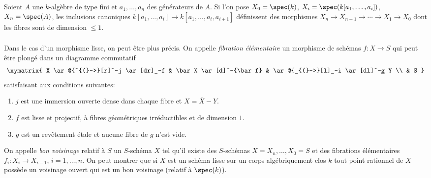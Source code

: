 \subsubsection{}\label{I:3-4-1}

Soient $A$ une $k$-algèbre de type fini et $a_1,\dotsc,a_n$ des générateurs de 
$A$. Si l'on pose $X_0=\spec(k)$, $X_i=\spec(k[a_1,\dotsc,a_i])$, 
$X_n=\spec(A)$, les inclusions canoniques 
$k[a_1,\dotsc,a_i]\to k[a_1,\dotsc,a_i,a_{i+1}]$ définissent des morphismes 
$X_n \to X_{n-1} \to \cdots \to X_1 \to X_0$ dont les fibres sont de dimension 
$\leqslant 1$. 





\subsubsection{}\label{I:3-4-2}

Dans le cas d'un morphisme lisse, on peut être plus précis. On appelle 
\emph{fibration élémentaire} un morphisme de schémas $f:X\to S$ qui peut 
être plongé dans un diagramme commutatif
\[\xymatrix{
  X \ar@{^{(}->}[r]^-j \ar[dr]_-f
    & \bar X \ar[d]^-{\bar f}
    & \ar@{_{(}->}[l]_-i \ar[dl]^-g Y \\
  & S
}\]
satisfaisant aux conditions suivantes:
\begin{enumerate}[\indent i)]
  \item $j$ est une immersion ouverte dense dans chaque fibre et 
    $X=\bar X - Y$. 
  \item $\bar f$ est lisse et projectif, à fibres géométriques 
    irréductibles et de dimension $1$.
  \item $g$ est un revêtement étale et aucune fibre de $g$ n'est vide.
\end{enumerate}

On appelle \emph{bon voisinage} relatif à $S$ un $S$-schéma $X$ tel qu'il 
existe des $S$-schémas $X=X_n,\dotsc,X_0=S$ et des fibrations élémentaires 
$f_i:X_i\to X_{i-1}$, $i=1,\dotsc,n$. On peut montrer  que si 
$X$ est un schéma lisse sur un corps algébriquement clos $k$ tout point 
rationnel de $X$ possède un voisinage ouvert qui est un bon voisinage 
(relatif à $\spec(k)$). 





\subsubsection{}\label{I:3-4-3}

